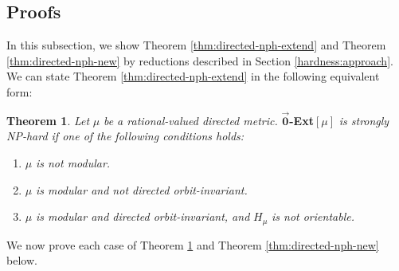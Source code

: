 \documentclass[11pt]{article}
\theoremstyle{definition}
\newtheorem{theorem}{Theorem}[section]
\begin{document}
\subsection{Proofs}
\label{hardness:proofs}
In this subsection, we show Theorem \ref{thm:directed-nph-extend} and Theorem \ref{thm:directed-nph-new} by reductions described in Section \ref{hardness:approach}. We can state Theorem \ref{thm:directed-nph-extend} in the following equivalent form:
\begin{theorem}
\label{thm:directed-nph-extend2}
\textit{Let} $\mu$ \textit{be a rational-valued directed metric.} $\overrightarrow{\textbf{0}}$\textbf{-Ext}$[\mu]$ \textit{is strongly NP-hard if one of the following conditions holds:} 
\begin{enumerate}[label=(\roman*),ref=\roman*]
    \item $\mu$ \textit{is not modular.}
    \label{thm:directed-nph-extend2-case1}
    \item $\mu$ \textit{is modular and not directed orbit-invariant.}
    \label{thm:directed-nph-extend2-case2}
    \item $\mu$ \textit{is modular and directed orbit-invariant, and} $H_\mu$ \textit{is not orientable.}
    \label{thm:directed-nph-extend2-case3}
\end{enumerate}
\end{theorem}
We now prove each case of Theorem \ref{thm:directed-nph-extend2} and Theorem \ref{thm:directed-nph-new} below.
\end{document}
